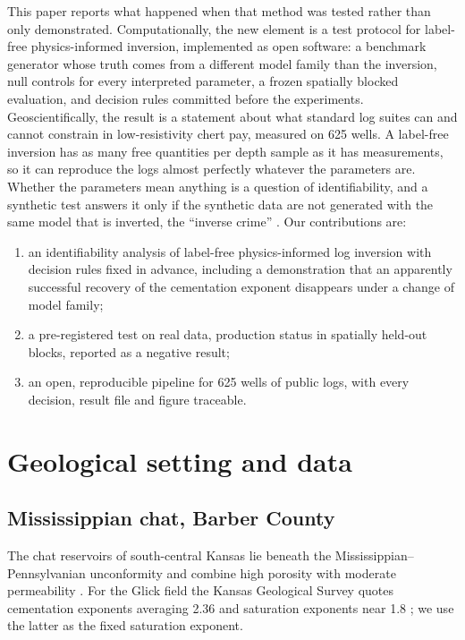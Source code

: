 \documentclass[preprint,12pt]{elsarticle}
\begin{document}
This paper reports what happened when that method was tested rather than only demonstrated.
Computationally, the new element is a test protocol for label-free physics-informed inversion,
implemented as open software: a benchmark generator whose truth comes from a different model
family than the inversion, null controls for every interpreted parameter, a frozen spatially
blocked evaluation, and decision rules committed before the experiments. Geoscientifically, the
result is a statement about what standard log suites can and cannot constrain in
low-resistivity chert pay, measured on 625 wells.
A label-free inversion has as many free quantities per depth sample as it has measurements, so
it can reproduce the logs almost perfectly whatever the parameters are. Whether the parameters
mean anything is a question of identifiability, and a synthetic test answers it only if the
synthetic data are not generated with the same model that is inverted, the ``inverse crime''
\citep{kaipio2007crimes}. Our contributions are:
\begin{enumerate}
\item an identifiability analysis of label-free physics-informed log inversion with decision
rules fixed in advance, including a demonstration that an apparently successful recovery of
the cementation exponent disappears under a change of model family;
\item a pre-registered test on real data, production status in spatially held-out blocks,
reported as a negative result;
\item an open, reproducible pipeline for 625 wells of public logs, with every decision,
result file and figure traceable.
\end{enumerate}

\section{Geological setting and data}

\subsection{Mississippian chat, Barber County}
The chat reservoirs of south-central Kansas lie beneath the Mississippian--Pennsylvanian
unconformity and combine high porosity with moderate permeability
\citep{montgomery1998chat,watney2001chat}. For the Glick field the Kansas Geological Survey
quotes cementation exponents averaging 2.36 and saturation exponents near 1.8
\citep{kgs2002chat}; we use the latter as the fixed saturation exponent.
\end{document}
